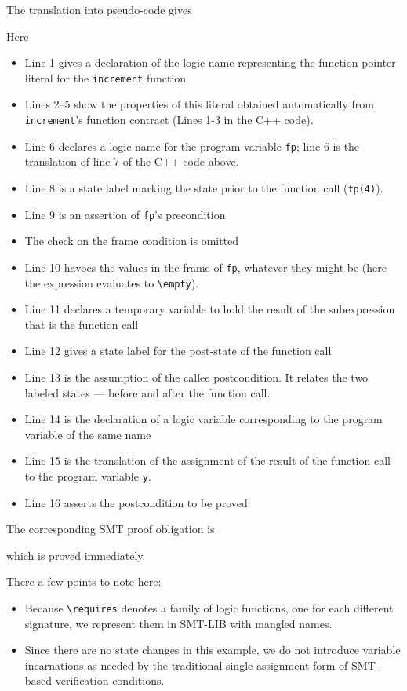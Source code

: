 The translation into pseudo-code gives


Here
\begin{itemize}[noitemsep,nolistsep]
	\item Line 1 gives a declaration of the logic name representing
	the function pointer literal for the \lstinline|increment| function
	\item Lines 2--5 show the properties of this literal obtained
	automatically from \lstinline|increment|'s function contract
	(Lines 1-3 in the C++ code).
	\item Line 6 declares a logic name for the program variable
	\lstinline|fp|; line 6 is the translation of line 7 of the C++ code above.
	\item Line 8 is a state label marking the state prior to the
	function call (\lstinline|fp(4)|).
	\item Line 9 is an assertion of \lstinline|fp|'s precondition
	\item The check on the frame condition is omitted
	\item Line 10 havocs the values in the frame of \lstinline|fp|,
	whatever they might be (here the expression evaluates to
	\lstinline|\empty|).
	\item Line 11 declares a temporary variable to hold the result of
	the subexpression that is the function call
	\item Line 12 gives a state label for the post-state of the function call
	\item Line 13 is the assumption of the callee postcondition. It relates the two labeled states --- before and after the function call.
	\item Line 14 is the declaration of a logic variable corresponding
	to the program variable of the same name
	\item Line 15 is the translation of the assignment of the result of
	the function call to the program variable \lstinline|y|.
	\item Line 16 asserts the postcondition to be proved
\end{itemize}

The corresponding SMT proof obligation is

which is proved immediately.

There a few points to note here:
\begin{itemize}
	\item Because \lstinline|\requires| denotes a family of logic functions, one for each different signature, we represent them in SMT-LIB with mangled names.
	\item Since there are no state changes in this example, we do not introduce variable incarnations as needed by the traditional
	single assignment form of SMT-based verification conditions.
\end{itemize}


